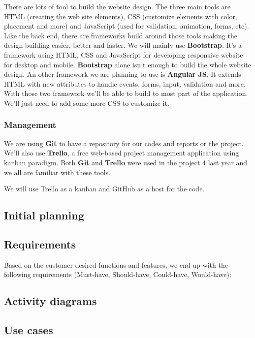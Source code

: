 There are lots of tool to build the website design. The three main tools are HTML (creating the web site elements), CSS (customize elements with color, placement and more) and JavaScript (used for validation, animation, forms, etc). Like the back end, there are frameworks build around those tools making the design building easier, better and faster. We will mainly use \textbf{Bootstrap}. It's a framework using HTML, CSS and JavaScript for developing responsive website for desktop and mobile. \textbf{Bootstrap} alone isn't enough to build the whole website design. An other framework we are planning to use is \textbf{Angular JS}. It extends HTML with new attributes to handle events, forms, input, validation and more. With those two framework we'll be able to build to most part of the application. We'll just need to add some more CSS to customize it.

\subsubsection{Management}

We are using \textbf{Git} to have a repository for our codes and reports or the project. We'll also use \textbf{Trello}, a free web-based project management application using kanban paradigm. Both \textbf{Git} and \textbf{Trello} were used in the project 4 last year and we all are familiar with these tools.

We will use Trello as a kanban and GitHub as a host for the code. \newline
\fi
\subsection{Initial planning}


\subsection{Requirements}
Based on the customer desired functions and features, we end up with the following requirements (Must-have, Should-have, Could-have, Would-have):



\subsection{Activity diagrams}
\subsection{Use cases}
